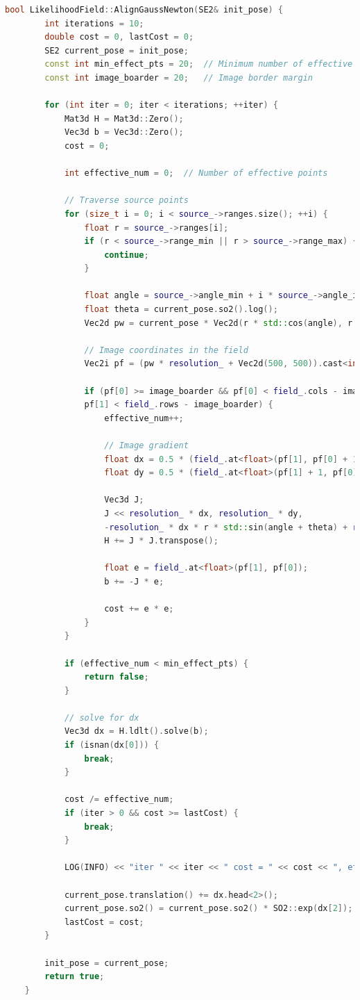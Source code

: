 \begin{lstlisting}[language=c++,caption=src/ch6/likelihood\_field.cc]  
	bool LikelihoodField::AlignGaussNewton(SE2& init_pose) {  
		int iterations = 10;  
		double cost = 0, lastCost = 0;  
		SE2 current_pose = init_pose;  
		const int min_effect_pts = 20;  // Minimum number of effective points  
		const int image_boarder = 20;   // Image border margin  
		
		for (int iter = 0; iter < iterations; ++iter) {  
			Mat3d H = Mat3d::Zero();  
			Vec3d b = Vec3d::Zero();  
			cost = 0;  
			
			int effective_num = 0;  // Number of effective points  
			
			// Traverse source points  
			for (size_t i = 0; i < source_->ranges.size(); ++i) {  
				float r = source_->ranges[i];  
				if (r < source_->range_min || r > source_->range_max) {  
					continue;  
				}  
				
				float angle = source_->angle_min + i * source_->angle_increment;  
				float theta = current_pose.so2().log();  
				Vec2d pw = current_pose * Vec2d(r * std::cos(angle), r * std::sin(angle));  
				
				// Image coordinates in the field  
				Vec2i pf = (pw * resolution_ + Vec2d(500, 500)).cast<int>();  
				
				if (pf[0] >= image_boarder && pf[0] < field_.cols - image_boarder && pf[1] >= image_boarder &&  
				pf[1] < field_.rows - image_boarder) {  
					effective_num++;  
					
					// Image gradient  
					float dx = 0.5 * (field_.at<float>(pf[1], pf[0] + 1) - field_.at<float>(pf[1], pf[0] - 1));  
					float dy = 0.5 * (field_.at<float>(pf[1] + 1, pf[0]) - field_.at<float>(pf[1] - 1, pf[0]));  
					
					Vec3d J;  
					J << resolution_ * dx, resolution_ * dy,  
					-resolution_ * dx * r * std::sin(angle + theta) + resolution_ * dy * r * std::cos(angle + theta);  
					H += J * J.transpose();  
					
					float e = field_.at<float>(pf[1], pf[0]);  
					b += -J * e;  
					
					cost += e * e;  
				}  
			}  
			
			if (effective_num < min_effect_pts) {  
				return false;  
			}  
			
			// solve for dx  
			Vec3d dx = H.ldlt().solve(b);  
			if (isnan(dx[0])) {  
				break;  
			}  
			
			cost /= effective_num;  
			if (iter > 0 && cost >= lastCost) {  
				break;  
			}  
			
			LOG(INFO) << "iter " << iter << " cost = " << cost << ", effect num: " << effective_num;  
			
			current_pose.translation() += dx.head<2>();  
			current_pose.so2() = current_pose.so2() * SO2::exp(dx[2]);  
			lastCost = cost;  
		}  
		
		init_pose = current_pose;  
		return true;  
	}  
\end{lstlisting}  

